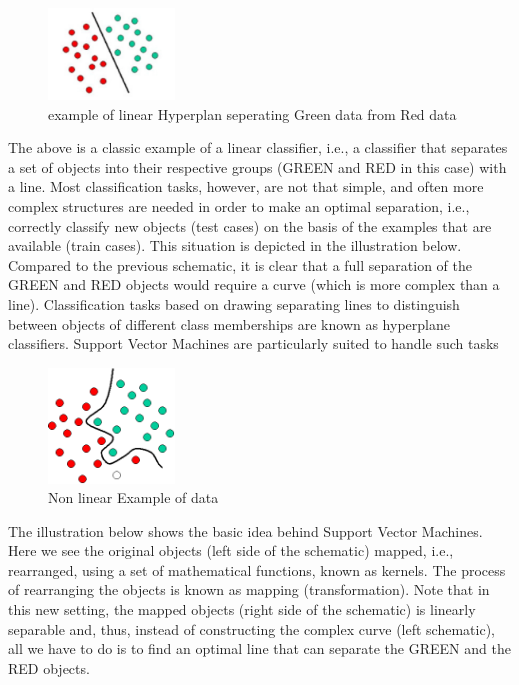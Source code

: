 \begin{figure}[H]
\centering
\includegraphics[width=0.3\textwidth]{img/svm1.png}
\caption{example of linear Hyperplan seperating Green data from Red data }
\label{122 }
\end{figure}


The above is a classic example of a linear classifier, i.e., a classifier that separates a set of objects into their respective groups (GREEN and RED in this case) with a line. Most classification tasks, however, are not that simple, and often more complex structures are needed in order to make an optimal separation, i.e., correctly classify new objects (test cases) on the basis of the examples that are available (train cases). This situation is depicted in the illustration below. Compared to the previous schematic, it is clear that a full separation of the GREEN and RED objects would require a curve (which is more complex than a line). Classification tasks based on drawing separating lines to distinguish between objects of different class memberships are known as hyperplane classifiers. Support Vector Machines are particularly suited to handle such tasks


\begin{figure}[H]
\centering
\includegraphics[width=0.3\textwidth]{img/svm2.png}
\caption{Non linear Example of data  }
\label{123 }
\end{figure}

The illustration below shows the basic idea behind Support Vector Machines. Here we see the original objects (left side of the schematic) mapped, i.e., rearranged, using a set of mathematical functions, known as kernels. The process of rearranging the objects is known as mapping (transformation). Note that in this new setting, the mapped objects (right side of the schematic) is linearly separable and, thus, instead of constructing the complex curve (left schematic), all we have to do is to find an optimal line that can separate the GREEN and the RED objects.

